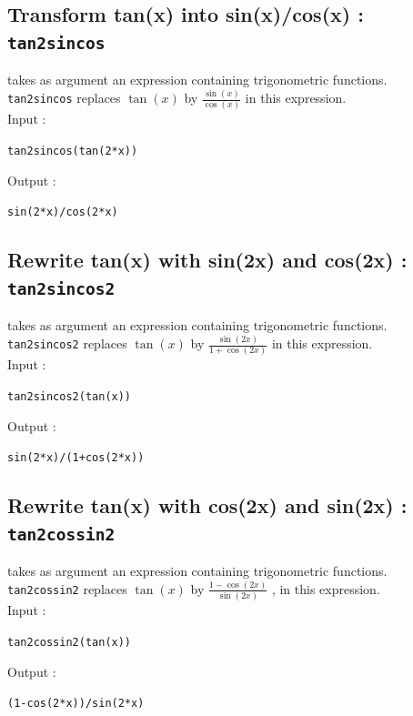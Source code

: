 \documentclass[a4paper,11pt]{book}
\begin{document}
\subsection{Transform tan(x) into sin(x)/cos(x) : {\tt tan2sincos}}
 takes as argument an expression containing 
trigonometric functions.\\
{\tt tan2sincos} replaces $\tan(x)$ by
 $\displaystyle \frac{\sin(x)}{\cos(x)}$ in this expression.\\
Input :
\begin{center}{\tt tan2sincos(tan(2*x))}\end{center}
Output :
\begin{center}{\tt sin(2*x)/cos(2*x)}\end{center}

\subsection{Rewrite tan(x) with sin(2x) and  cos(2x) : {\tt tan2sincos2}}
 takes as argument an expression containing 
trigonometric functions.\\
{\tt tan2sincos2} replaces $\tan(x)$ by 
$\displaystyle \frac{\sin(2x)}{1+\cos(2x)}$ in this  expression.\\
Input :
\begin{center}{\tt tan2sincos2(tan(x))}\end{center}
Output :
\begin{center}{\tt sin(2*x)/(1+cos(2*x))}\end{center}

\subsection{Rewrite tan(x) with cos(2x) and  sin(2x) : {\tt tan2cossin2}}
 takes as argument an expression 
containing trigonometric functions.\\
{\tt tan2cossin2} replaces $\tan(x)$ by 
$\displaystyle \frac{1-\cos(2x)}{\sin(2x)}$ , in this expression.\\
Input :
\begin{center}{\tt tan2cossin2(tan(x))}\end{center}
Output :
\begin{center}{\tt (1-cos(2*x))/sin(2*x)}\end{center}
\end{document}
